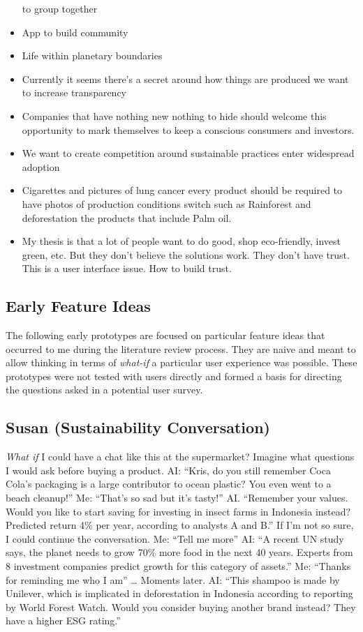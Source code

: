 \documentclass[
  letterpaper,
  DIV=11,
  numbers=noendperiod]{scrartcl}
\begin{document}
\begin{itemize}
  to group together
\item
  App to build community
\item
  Life within planetary boundaries
\item
  Currently it seems there's a secret around how things are produced we
  want to increase transparency
\item
  Companies that have nothing new nothing to hide should welcome this
  opportunity to mark themselves to keep a conscious consumers and
  investors.
\item
  We want to create competition around sustainable practices enter
  widespread adoption
\item
  Cigarettes and pictures of lung cancer every product should be
  required to have photos of production conditions switch such as
  Rainforest and deforestation the products that include Palm oil.
\item
  My thesis is that a lot of people want to do good, shop eco-friendly,
  invest green, etc. But they don't believe the solutions work. They
  don't have trust. This is a user interface issue. How to build trust.
\end{itemize}

\newpage

\subsection{Early Feature Ideas}\label{early-feature-ideas}

The following early prototypes are focused on particular feature ideas
that occurred to me during the literature review process. They are naive
and meant to allow thinking in terms of \emph{what-if} a particular user
experience was possible. These prototypes were not tested with users
directly and formed a basis for directing the questions asked in a
potential user survey.

\subsection{Susan (Sustainability
Conversation)}\label{susan-sustainability-conversation}

\emph{What if} I could have a chat like this at the supermarket? Imagine
what questions I would ask before buying a product. AI: ``Kris, do you
still remember Coca Cola's packaging is a large contributor to ocean
plastic? You even went to a beach cleanup!'' Me: ``That's so sad but
it's tasty!'' AI. ``Remember your values. Would you like to start saving
for investing in insect farms in Indonesia instead? Predicted return 4\%
per year, according to analysts A and B.'' If I'm not so sure, I could
continue the conversation. Me: ``Tell me more'' AI: ``A recent UN study
says, the planet needs to grow 70\% more food in the next 40 years.
Experts from 8 investment companies predict growth for this category of
assets.'' Me: ``Thanks for reminding me who I am'' \ldots{} Moments
later. AI: ``This shampoo is made by Unilever, which is implicated in
deforestation in Indonesia according to reporting by World Forest Watch.
Would you consider buying another brand instead? They have a higher ESG
rating.''
\end{document}
